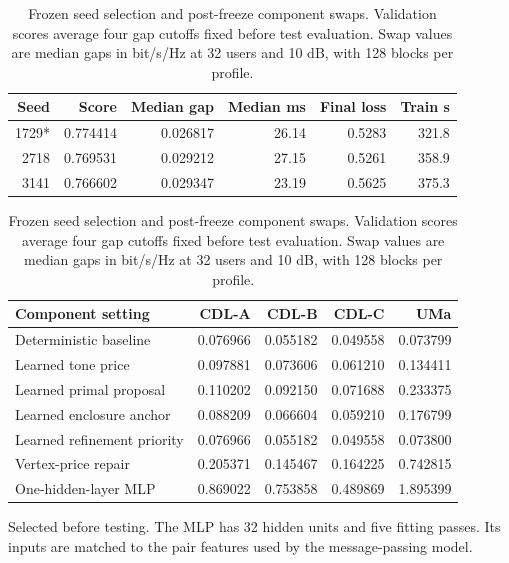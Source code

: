\documentclass[10pt,letterpaper]{article}
\begin{document}
\begin{table}[htbp]\centering\small
\caption{Frozen seed selection and post-freeze component swaps. Validation scores average four gap cutoffs fixed before test evaluation. Swap values are median gaps in bit/s/Hz at 32 users and 10 dB, with 128 blocks per profile.}\label{supp:table4}
\begin{tabular}{rrrrrr}\toprule Seed & Score & Median gap & Median ms & Final loss & Train s\\\midrule
1729* & 0.774414 & 0.026817 & 26.14 & 0.5283 & 321.8\\
2718 & 0.769531 & 0.029212 & 27.15 & 0.5261 & 358.9\\
3141 & 0.766602 & 0.029347 & 23.19 & 0.5625 & 375.3\\
\bottomrule\end{tabular}\par\smallskip
\begin{tabular}{lrrrr}\toprule Component setting & CDL-A & CDL-B & CDL-C & UMa\\\midrule
Deterministic baseline & 0.076966 & 0.055182 & 0.049558 & 0.073799\\
Learned tone price & 0.097881 & 0.073606 & 0.061210 & 0.134411\\
Learned primal proposal & 0.110202 & 0.092150 & 0.071688 & 0.233375\\
Learned enclosure anchor & 0.088209 & 0.066604 & 0.059210 & 0.176799\\
Learned refinement priority & 0.076966 & 0.055182 & 0.049558 & 0.073800\\
Vertex-price repair & 0.205371 & 0.145467 & 0.164225 & 0.742815\\
One-hidden-layer MLP & 0.869022 & 0.753858 & 0.489869 & 1.895399\\
\bottomrule\end{tabular}\par\smallskip\footnotesize *Selected before testing. The MLP has 32 hidden units and five fitting passes. Its inputs are matched to the pair features used by the message-passing model.\end{table}
\end{document}
